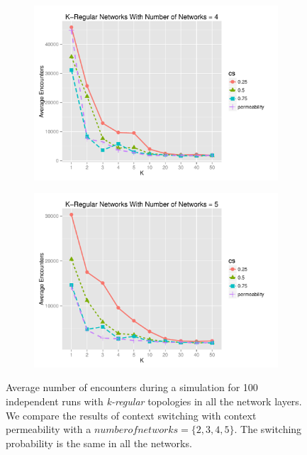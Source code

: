 \documentclass[preprint,number]{elsarticle}
\begin{document}
\begin{figure}[H]
\begin{subfigure}{.49\linewidth}
          \centering
          \includegraphics[width=1\linewidth]{"../analysis/pdf/context_switching_encounters_comp_kregular_groupedbynets_4"}
          \caption{}
          \label{fig:ctx_switching_comp_kreg_4}
	\end{subfigure}
	\begin{subfigure}{.5\linewidth}
          \centering
          \includegraphics[width=1\linewidth]{"../analysis/pdf/context_switching_encounters_comp_kregular_groupedbynets_5"}
          \caption{}
          \label{fig:ctx_switching_comp_kreg_5}
	\end{subfigure}
	\begin{minipage}{0.9\textwidth}
          \vspace{0.2cm}
          \caption{Average number of encounters during a simulation for 100 independent runs with
            \textit{k-regular} topologies in all the network layers. We compare the results of
            context switching with context permeability with a $number of networks =
            \{2,3,4,5\}$. The switching probability is the same in all the networks. }
		\label{fig:ctx_switching_comp_kreg}
	\end{minipage}
      \end{figure}
\end{document}
